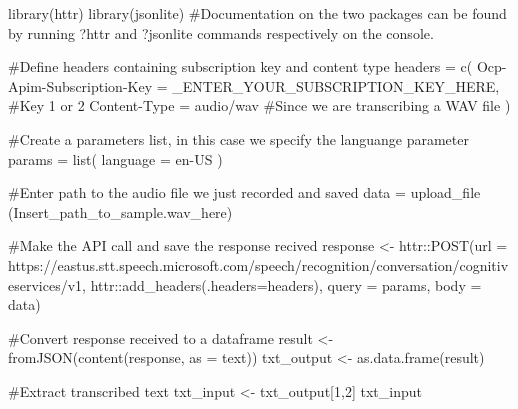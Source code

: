 \documentclass[
  letterpaper,
  DIV=11,
  numbers=noendperiod]{scrreprt}
\newenvironment{Shaded}{\begin{snugshade}}{\end{snugshade}}
\newcommand{\AttributeTok}[1]{\textcolor[rgb]{0.40,0.45,0.13}{#1}}
\newcommand{\CommentTok}[1]{\textcolor[rgb]{0.37,0.37,0.37}{#1}}
\newcommand{\DecValTok}[1]{\textcolor[rgb]{0.68,0.00,0.00}{#1}}
\newcommand{\FunctionTok}[1]{\textcolor[rgb]{0.28,0.35,0.67}{#1}}
\newcommand{\NormalTok}[1]{\textcolor[rgb]{0.00,0.23,0.31}{#1}}
\newcommand{\OtherTok}[1]{\textcolor[rgb]{0.00,0.23,0.31}{#1}}
\newcommand{\SpecialCharTok}[1]{\textcolor[rgb]{0.37,0.37,0.37}{#1}}
\newcommand{\StringTok}[1]{\textcolor[rgb]{0.13,0.47,0.30}{#1}}
\begin{document}
\begin{Shaded}
\begin{Highlighting}[]
\FunctionTok{library}\NormalTok{(httr)}
\FunctionTok{library}\NormalTok{(jsonlite)  }
\CommentTok{\#Documentation on the two packages can be found by running ?httr and ?jsonlite commands respectively on the console.}

\CommentTok{\#Define headers containing subscription key and content type}
\NormalTok{headers }\OtherTok{=} \FunctionTok{c}\NormalTok{(}
  \StringTok{\textasciigrave{}}\AttributeTok{Ocp{-}Apim{-}Subscription{-}Key}\StringTok{\textasciigrave{}} \OtherTok{=} \StringTok{\textquotesingle{}\_ENTER\_YOUR\_SUBSCRIPTION\_KEY\_HERE\textquotesingle{}}\NormalTok{,  }\CommentTok{\#Key 1 or 2}
  \StringTok{\textasciigrave{}}\AttributeTok{Content{-}Type}\StringTok{\textasciigrave{}} \OtherTok{=} \StringTok{\textquotesingle{}audio/wav\textquotesingle{}} \CommentTok{\#Since we are transcribing a WAV file}
\NormalTok{)}

\CommentTok{\#Create a parameters list, in this case we specify the languange parameter}
\NormalTok{params }\OtherTok{=} \FunctionTok{list}\NormalTok{(}
  \StringTok{\textasciigrave{}}\AttributeTok{language}\StringTok{\textasciigrave{}} \OtherTok{=} \StringTok{\textquotesingle{}en{-}US\textquotesingle{}}
\NormalTok{)}

\CommentTok{\#Enter path to the audio file we just recorded and saved}
\NormalTok{data }\OtherTok{=} \FunctionTok{upload\_file}\NormalTok{ (}\StringTok{\textquotesingle{}Insert\_path\_to\_sample.wav\_here\textquotesingle{}}\NormalTok{) }

\CommentTok{\#Make the API call and save the response recived}
\NormalTok{response }\OtherTok{\textless{}{-}}\NormalTok{ httr}\SpecialCharTok{::}\FunctionTok{POST}\NormalTok{(}\AttributeTok{url =} \StringTok{\textquotesingle{}https://eastus.stt.speech.microsoft.com/speech/recognition/conversation/cognitiveservices/v1\textquotesingle{}}\NormalTok{, }
\NormalTok{httr}\SpecialCharTok{::}\FunctionTok{add\_headers}\NormalTok{(}\AttributeTok{.headers=}\NormalTok{headers), }\AttributeTok{query =}\NormalTok{ params, }\AttributeTok{body =}\NormalTok{ data)}

\CommentTok{\#Convert response received to a dataframe}
\NormalTok{result }\OtherTok{\textless{}{-}} \FunctionTok{fromJSON}\NormalTok{(}\FunctionTok{content}\NormalTok{(response, }\AttributeTok{as  =} \StringTok{\textquotesingle{}text\textquotesingle{}}\NormalTok{)) }
\NormalTok{txt\_output }\OtherTok{\textless{}{-}} \FunctionTok{as.data.frame}\NormalTok{(result)}

\CommentTok{\#Extract transcribed text}
\NormalTok{txt\_input }\OtherTok{\textless{}{-}}\NormalTok{ txt\_output[}\DecValTok{1}\NormalTok{,}\DecValTok{2}\NormalTok{]}
\NormalTok{txt\_input}
\end{Highlighting}
\end{Shaded}
\end{document}
